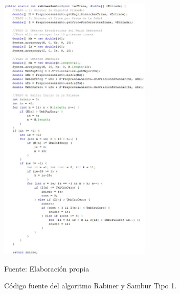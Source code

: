\begin{enumerate}
\begin{figure}[H]
\captionsetup{justification=centering}
\begin{center}
\includegraphics[width=0.65\textwidth]{Imagenes/Cap3/image017}
\end{center}
\begin{center}
\vskip -0.5cm
\caption{\small{Código fuente del algoritmo Rabiner y Sambur Tipo 1.}}
\label{fig:figura3.17}
{\small{Fuente: Elaboración propia}}
\end{center}
\end{figure}


\end{enumerate}
